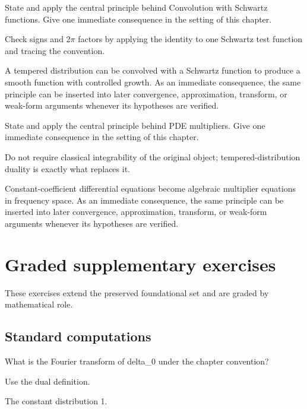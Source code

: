 \begin{exercise}\label{exr:iii19-07}
State and apply the central principle behind Convolution with Schwartz functions. Give one immediate consequence in the setting of this chapter.
\end{exercise}
\begin{hint}
Check signs and \(2\pi\) factors by applying the identity to one Schwartz test function and tracing the convention.
\end{hint}
\begin{solution}
A tempered distribution can be convolved with a Schwartz function to produce a smooth function with controlled growth. As an immediate consequence, the same principle can be inserted into later convergence, approximation, transform, or weak-form arguments whenever its hypotheses are verified.
\end{solution}

\begin{exercise}\label{exr:iii19-08}
State and apply the central principle behind PDE multipliers. Give one immediate consequence in the setting of this chapter.
\end{exercise}
\begin{hint}
Do not require classical integrability of the original object; tempered-distribution duality is exactly what replaces it.
\end{hint}
\begin{solution}
Constant-coefficient differential equations become algebraic multiplier equations in frequency space. As an immediate consequence, the same principle can be inserted into later convergence, approximation, transform, or weak-form arguments whenever its hypotheses are verified.
\end{solution}


\section{Graded supplementary exercises}
These exercises extend the preserved foundational set and are graded by mathematical role.

\subsection*{Standard computations}

\begin{exercise}\label{exr:iii19-expand-01}
What is the Fourier transform of delta\_0 under the chapter convention?
\end{exercise}
\begin{hint}
Use the dual definition.
\end{hint}
\begin{solution}
The constant distribution 1.
\end{solution}

